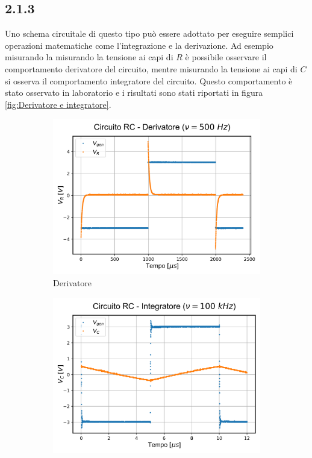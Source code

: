 \subsection{2.1.3}
Uno schema circuitale di questo tipo può essere adottato per eseguire semplici operazioni matematiche come l'integrazione e la derivazione.
Ad esempio misurando la misurando la tensione ai capi di $R$ è possibile osservare il comportamento derivatore del circuito, mentre misurando la tensione ai capi di $C$ si osserva il comportamento integratore del circuito.
Questo comportamento è stato osservato in laboratorio e i risultati sono stati riportati in figura \ref{fig:Derivatore e integratore}.
\begin{figure}[ht]
    \centering
    \begin{subfigure}[b]{0.5\textwidth}
        \centering
        \includegraphics[width=\textwidth]{RC_derivatore.png}
        \caption{Derivatore}
        \label{fig:Derivatore}
    \end{subfigure}%
    \hfill %
    \begin{subfigure}[b]{0.5\textwidth}
        \centering
        \includegraphics[width=\textwidth]{RC_integratore.png}

\end{subfigure}
\end{figure}
